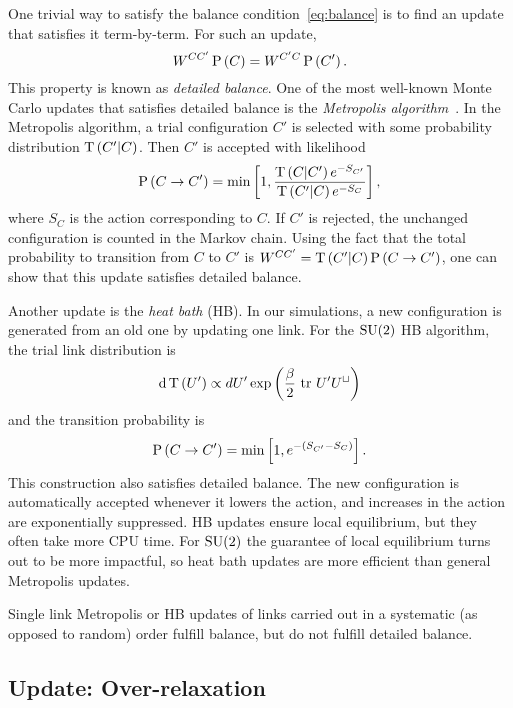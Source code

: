 One trivial way to satisfy the balance condition~\eqref{eq:balance} is
to find an update that satisfies it term-by-term. For such an update, 
\begin{equation}\label{eq:detailedbalance}
    W^{CC'}\operatorname{P}\left(C\right)=W^{C'C}\operatorname{P}\left(C'\right).
\end{equation}
This property is known as {\it detailed balance}.
One of the most well-known Monte Carlo updates that satisfies detailed
balance is the {\it Metropolis algorithm}~\cite{metropolis_equation_1953}. 
In the Metropolis algorithm, a trial configuration $C'$ is selected 
with some probability distribution $\operatorname{T}\left(C'|C\right)$. Then $C'$
is accepted with likelihood
\begin{equation}\label{eq:metupdate}
  \operatorname{P}\left(C\to C'\right)=\min\left[1,\frac{\operatorname{T}\left(C|C'\right)e^{-S_{C'}}}
    {\operatorname{T}\left(C'|C\right)e^{-S_C}}\right],
\end{equation}
where $S_C$ is the action corresponding to $C$. 
If $C'$ is rejected, the unchanged configuration is counted
in the Markov chain. Using the fact that the total probability
to transition from $C$ to $C'$ is $W^{CC'}=\operatorname{T}\left(C'|C\right)\operatorname{P}\left(C\to C'\right)$, one
can show that this update satisfies detailed balance.

Another update is the {\it heat bath} (HB). In our
simulations, a new configuration is generated from an old one by updating one
link. For the $\operatorname{SU}(2)$ HB algorithm, the trial link distribution is
\begin{equation}\label{eq:PTdist}
  \dd{\operatorname{T}\left(U'\right)}\propto dU'\exp\left(\frac{\beta}{2}\,\tr\,
  U'U^\sqcup\right)
\end{equation}
and the transition probability is
\begin{equation}
  \operatorname{P}\left(C\to C'\right)=\min\left[1,e^{-(S_{C'}-S_C)}\right].
\end{equation}
This construction also satisfies detailed balance. The new configuration 
is automatically accepted whenever it lowers the action, and
increases in the action are exponentially suppressed.
HB updates ensure local equilibrium, but they often 
take more CPU time. For $\operatorname{SU}(2)$ the guarantee of local equilibrium
turns out to be more impactful, so heat bath updates are more efficient
than general Metropolis updates.

Single link Metropolis or HB updates of links carried out in a systematic 
(as opposed to random) order fulfill balance, but do not
fulfill detailed balance.

\subsection{Update: Over-relaxation}

